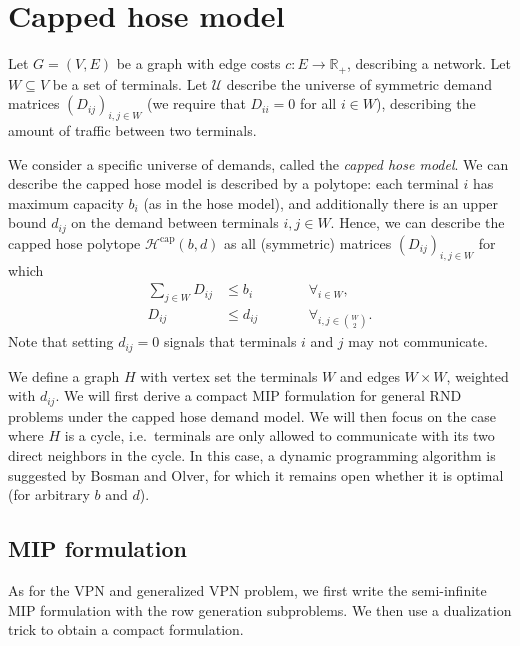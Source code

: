 \section{Capped hose model}
Let $G = (V, E)$ be a graph with edge costs $c\colon E \to \mathbb R_+$, describing a network.
Let $W \subseteq V$ be a set of terminals.
Let $\mathcal U$ describe the universe of symmetric demand matrices $(D_{ij})_{i,j \in W}$ (we require that $D_{ii} = 0$ for all $i \in W$), describing the amount of traffic between two terminals.

We consider a specific universe of demands, called the \emph{capped hose model}.
We can describe the capped hose model is described by a polytope: each terminal $i$ has maximum capacity $b_i$ (as in the hose model), and additionally there is an upper bound $d_{ij}$ on the demand between terminals $i,j \in W$.
Hence, we can describe the capped hose polytope $\mathcal H^\text{cap}(b, d)$ as all (symmetric) matrices $(D_{ij})_{i,j \in W}$ for which
\[
    \begin{split}
        \sum_{j \in W} D_{ij} &\le b_i \qquad&&\forall_{i \in W}, \\
        D_{ij} &\le d_{ij} \qquad&&\forall_{i,j \in \binom W 2}.
    \end{split}
\]
Note that setting $d_{ij} = 0$ signals that terminals $i$ and $j$ may not communicate.

We define a graph $H$ with vertex set the terminals $W$ and edges $W \times W$, weighted with $d_{ij}$.
We will first derive a compact MIP formulation for general RND problems under the capped hose demand model.
We will then focus on the case where $H$ is a cycle, i.e.\ terminals are only allowed to communicate with its two direct neighbors in the cycle.
In this case, a dynamic programming algorithm is suggested by Bosman and Olver, for which it remains open whether it is optimal (for arbitrary $b$ and $d$).

\subsection{MIP formulation}
As for the VPN and generalized VPN problem, we first write the semi-infinite MIP formulation with the row generation subproblems.
We then use a dualization trick to obtain a compact formulation.

